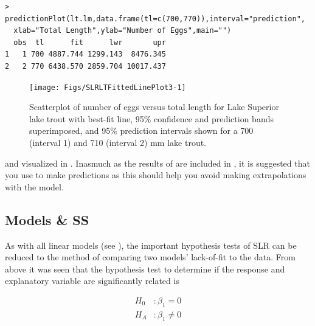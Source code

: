 \documentclass[10pt,openany]{book}\usepackage[]{graphicx}\usepackage[]{color}
\makeatletter
\newenvironment{kframe}{%
 \def\at@end@of@kframe{}%
 \ifinner\ifhmode%
  \def\at@end@of@kframe{\end{minipage}}%
  \begin{minipage}{\columnwidth}%
 \fi\fi%
 \def\FrameCommand##1{\hskip\@totalleftmargin \hskip-\fboxsep
 \colorbox{shadecolor}{##1}\hskip-\fboxsep
     \hskip-\linewidth \hskip-\@totalleftmargin \hskip\columnwidth}%
 \MakeFramed {\advance\hsize-\width
   \@totalleftmargin\z@ \linewidth\hsize
   \@setminipage}}%
 {\par\unskip\endMakeFramed%
 \at@end@of@kframe}
\newenvironment{knitrout}{}{} %
\makeatother
\begin{document}
\begin{knitrout}
\color{fgcolor}\begin{kframe}
\begin{verbatim}
> predictionPlot(lt.lm,data.frame(tl=c(700,770)),interval="prediction",
  xlab="Total Length",ylab="Number of Eggs",main="")
  obs  tl      fit      lwr       upr
1   1 700 4887.744 1299.143  8476.345
2   2 770 6438.570 2859.704 10017.437
\end{verbatim}
\end{kframe}\begin{figure}[h]

{\centering \texttt{[image: Figs/SLRLTFittedLinePlot3-1]} 

}

\caption[Scatterplot of number of eggs versus total length for Lake Superior lake trout with best-fit line, 95\% confidence and prediction bands superimposed, and 95\% prediction intervals shown for a 700 (interval 1) and 710 (interval 2) mm lake trout]{Scatterplot of number of eggs versus total length for Lake Superior lake trout with best-fit line, 95\% confidence and prediction bands superimposed, and 95\% prediction intervals shown for a 700 (interval 1) and 710 (interval 2) mm lake trout.}\label{fig:SLRLTFittedLinePlot3}
\end{figure}


\end{knitrout}

and visualized in .  Inasmuch as the results of  are included in , it is suggested that you use  to make predictions as this should help you avoid making extrapolations with the model.

\subsection{Models \& SS}
As with all linear models (see ), the important hypothesis tests of SLR can be reduced to the method of comparing two models' lack-of-fit to the data.  From above it was seen that the hypothesis test to determine if the response and explanatory variable are significantly related is

\[ \begin{split}
H_{0}&: \beta_{1} = 0 \\
H_{A}&: \beta_{1} \neq 0
\end{split} \]
\end{document}
